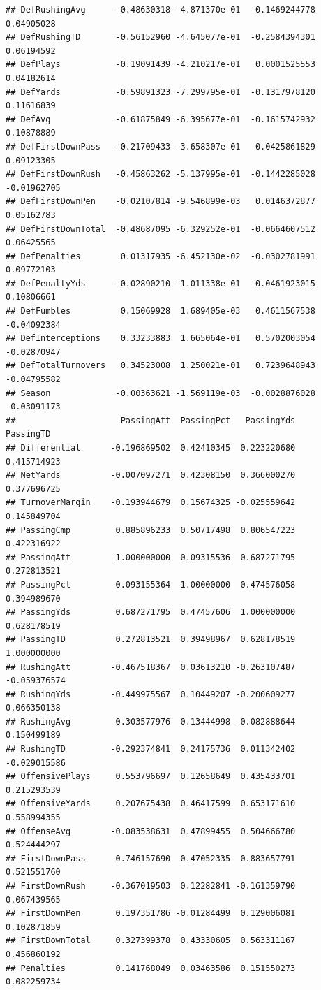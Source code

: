 \documentclass[
]{book}
\begin{document}
\begin{verbatim}
## DefRushingAvg      -0.48630318 -4.871370e-01  -0.1469244778  0.04905028
## DefRushingTD       -0.56152960 -4.645077e-01  -0.2584394301  0.06194592
## DefPlays           -0.19091439 -4.210217e-01   0.0001525553  0.04182614
## DefYards           -0.59891323 -7.299795e-01  -0.1317978120  0.11616839
## DefAvg             -0.61875849 -6.395677e-01  -0.1615742932  0.10878889
## DefFirstDownPass   -0.21709433 -3.658307e-01   0.0425861829  0.09123305
## DefFirstDownRush   -0.45863262 -5.137995e-01  -0.1442285028 -0.01962705
## DefFirstDownPen    -0.02107814 -9.546899e-03   0.0146372877  0.05162783
## DefFirstDownTotal  -0.48687095 -6.329252e-01  -0.0664607512  0.06425565
## DefPenalties        0.01317935 -6.452130e-02  -0.0302781991  0.09772103
## DefPenaltyYds      -0.02890210 -1.011338e-01  -0.0461923015  0.10806661
## DefFumbles          0.15069928  1.689405e-03   0.4611567538 -0.04092384
## DefInterceptions    0.33233883  1.665064e-01   0.5702003054 -0.02870947
## DefTotalTurnovers   0.34523008  1.250021e-01   0.7239648943 -0.04795582
## Season             -0.00363621 -1.569119e-03  -0.0028876028 -0.03091173
##                     PassingAtt  PassingPct   PassingYds    PassingTD
## Differential      -0.196869502  0.42410345  0.223220680  0.415714923
## NetYards          -0.007097271  0.42308150  0.366000270  0.377696725
## TurnoverMargin    -0.193944679  0.15674325 -0.025559642  0.145849704
## PassingCmp         0.885896233  0.50717498  0.806547223  0.422316922
## PassingAtt         1.000000000  0.09315536  0.687271795  0.272813521
## PassingPct         0.093155364  1.00000000  0.474576058  0.394989670
## PassingYds         0.687271795  0.47457606  1.000000000  0.628178519
## PassingTD          0.272813521  0.39498967  0.628178519  1.000000000
## RushingAtt        -0.467518367  0.03613210 -0.263107487 -0.059376574
## RushingYds        -0.449975567  0.10449207 -0.200609277  0.066350138
## RushingAvg        -0.303577976  0.13444998 -0.082888644  0.150499189
## RushingTD         -0.292374841  0.24175736  0.011342402 -0.029015586
## OffensivePlays     0.553796697  0.12658649  0.435433701  0.215293539
## OffensiveYards     0.207675438  0.46417599  0.653171610  0.558994355
## OffenseAvg        -0.083538631  0.47899455  0.504666780  0.524444297
## FirstDownPass      0.746157690  0.47052335  0.883657791  0.521551760
## FirstDownRush     -0.367019503  0.12282841 -0.161359790  0.067439565
## FirstDownPen       0.197351786 -0.01284499  0.129006081  0.102871859
## FirstDownTotal     0.327399378  0.43330605  0.563311167  0.456860192
## Penalties          0.141768049  0.03463586  0.151550273  0.082259734

\end{verbatim}
\end{document}

